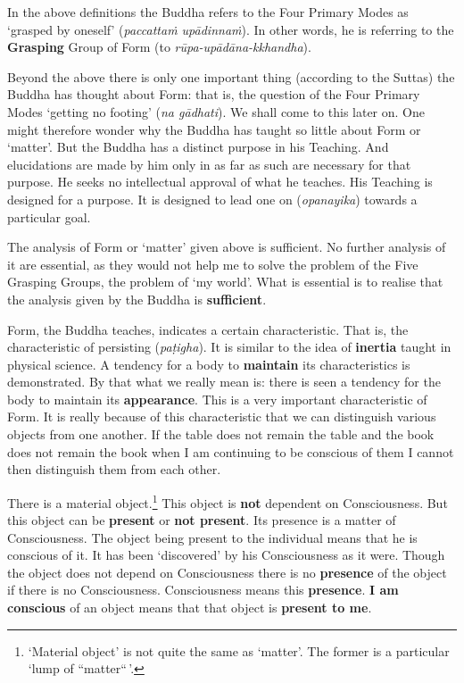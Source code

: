 In the above definitions the Buddha refers to the Four Primary Modes as `grasped by oneself' (\emph{paccattaṁ upādinnaṁ}). In other words, he is referring to the \textbf{Grasping} Group of Form (to \emph{rūpa-upādāna-kkhandha}).

Beyond the above there is only one important thing (according to the Suttas) the Buddha has thought about Form: that is, the question of the Four Primary Modes `getting no footing' (\emph{na gādhati}). We shall come to this later on. One might therefore wonder why the Buddha has taught so little about Form or `matter'. But the Buddha has a distinct purpose in his Teaching. And elucidations are made by him only in as far as such are necessary for that purpose. He seeks no intellectual approval of what he teaches. His Teaching is designed for a purpose. It is designed to lead one on (\emph{opanayika}) towards a particular goal.

The analysis of Form or `matter' given above is sufficient. No further analysis of it are essential, as they would not help me to solve the problem of the Five Grasping Groups, the problem of `my world'. What is essential is to realise that the analysis given by the Buddha is \textbf{sufficient}.

Form, the Buddha teaches, indicates a certain characteristic. That is, the characteristic of persisting (\emph{paṭigha}). It is similar to the idea of \textbf{inertia} taught in physical science. A tendency for a body to \textbf{maintain} its characteristics is demonstrated. By that what we really mean is: there is seen a tendency for the body to maintain its \textbf{appearance}. This is a very important characteristic of Form. It is really because of this characteristic that we can distinguish various objects from one another. If the table does not remain the table and the book does not remain the book when I am continuing to be conscious of them I cannot then distinguish them from each other.

There is a material object.\footnote{`Material object' is not quite the same as `matter'. The former is a particular `lump of ``matter``\,'.} This object is \textbf{not} dependent on Consciousness. But this object can be \textbf{present} or \textbf{not present}. Its presence is a matter of Consciousness. The object being present to the individual means that he is conscious of it. It has been `discovered' by his Consciousness as it were. Though the object does not depend on Consciousness there is no \textbf{presence} of the object if there is no Consciousness. Consciousness means this \textbf{presence}. \textbf{I am conscious} of an object means that that object is \textbf{present to me}.

